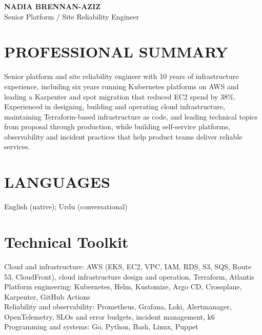 \documentclass[11pt,a4paper]{article}
\begin{document}
{\begin{center}
{\LARGE\bfseries\color{primarycolor} NADIA BRENNAN-AZIZ}\\[0.25em]
{\large\color{accentcolor} Senior Platform / Site Reliability Engineer}
\end{center}}

\section*{PROFESSIONAL SUMMARY}
Senior platform and site reliability engineer with 10 years of infrastructure experience, including six years running Kubernetes platforms on AWS and leading a Karpenter and spot migration that reduced EC2 spend by 38\%. Experienced in designing, building and operating cloud infrastructure, maintaining Terraform-based infrastructure as code, and leading technical topics from proposal through production, while building self-service platforms, observability and incident practices that help product teams deliver reliable services.

\section*{LANGUAGES}
English (native); Urdu (conversational)

\section*{Technical Toolkit}
Cloud and infrastructure: AWS (EKS, EC2, VPC, IAM, RDS, S3, SQS, Route 53, CloudFront), cloud infrastructure design and operation, Terraform, Atlantis\\
Platform engineering: Kubernetes, Helm, Kustomize, Argo CD, Crossplane, Karpenter, GitHub Actions\\
Reliability and observability: Prometheus, Grafana, Loki, Alertmanager, OpenTelemetry, SLOs and error budgets, incident management, k6\\
Programming and systems: Go, Python, Bash, Linux, Puppet
\end{document}
